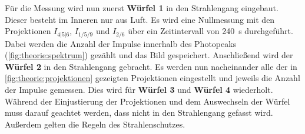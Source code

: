     Für die Messung wird nun zuerst \textbf{Würfel 1} in den Strahlengang eingebaut.
    Dieser besteht im Inneren nur aus Luft.
    Es wird eine Nullmessung mit den Projektionen $I_\text{4|5|6}$, $I_\text{1/5/9}$ und $I_\text{2/6}$ über ein Zeitintervall von \SI{240}{\second} durchgeführt.
    Dabei werden die Anzahl der Impulse innerhalb des Photopeaks (\autoref{fig:theorie:spektrum}) gezählt und das Bild gespeichert.
    Anschließend wird der \textbf{Würfel 2} in den Strahlengang gebracht.
    Es werden nun nacheinander alle der in \autoref{fig:theorie:projektionen} gezeigten Projektionen eingestellt und jeweils die Anzahl der Impulse gemessen.
    Dies wird für \textbf{Würfel 3} und \textbf{Würfel 4} wiederholt.
    Während der Einjustierung der Projektionen und dem Auswechseln der Würfel muss darauf geachtet werden,
    dass nicht in den Strahlengang gefasst wird.
    Außerdem gelten die Regeln des Strahlenschutzes.

